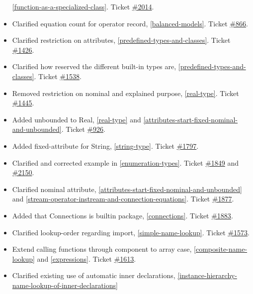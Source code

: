 \documentclass[../MLS.tex]{subfiles}
\begin{document}
\begin{itemize}
  \autoref{function-as-a-specialized-class}. Ticket
  \href{https://trac.modelica.org/Modelica/ticket/2014}{\#2014}.
\item
  Clarified equation count for operator record, \autoref{balanced-models}. Ticket
  \href{https://trac.modelica.org/Modelica/ticket/866}{\#866}.
\item
  Clarified restriction on attributes, \autoref{predefined-types-and-classes}. Ticket
  \href{https://trac.modelica.org/Modelica/ticket/1426}{\#1426}.
\item
  Clarified how reserved the different built-in types are, \autoref{predefined-types-and-classes}.
  Ticket \href{https://trac.modelica.org/Modelica/ticket/1538}{\#1538}.
\item
  Removed restriction on nominal and explained purpose, \autoref{real-type}.
  Ticket \href{https://trac.modelica.org/Modelica/ticket/1445}{\#1445}.
\item
  Added unbounded to Real, \autoref{real-type} and \autoref{attributes-start-fixed-nominal-and-unbounded}. Ticket
  \href{https://trac.modelica.org/Modelica/ticket/926}{\#926}.
\item
  Added fixed-attribute for String, \autoref{string-type}. Ticket
  \href{https://trac.modelica.org/Modelica/ticket/1797}{\#1797}.
\item
  Clarified and corrected example in \autoref{enumeration-types}. Ticket
  \href{https://trac.modelica.org/Modelica/ticket/1849}{\#1849} and
  \href{https://trac.modelica.org/Modelica/ticket/2150}{\#2150}.
\item
  Clarified nominal attribute, \autoref{attributes-start-fixed-nominal-and-unbounded} 
  and \autoref{stream-operator-instream-and-connection-equations}. Ticket
  \href{https://trac.modelica.org/Modelica/ticket/1877}{\#1877}.
\item
  Added that Connections is builtin package, \autoref{connections}. Ticket
  \href{https://trac.modelica.org/Modelica/ticket/1883}{\#1883}.
\item
  Clarified lookup-order regarding import, \autoref{simple-name-lookup}. Ticket
  \href{https://trac.modelica.org/Modelica/ticket/1573}{\#1573}.
\item
  Extend calling functions through component to array case, \autoref{composite-name-lookup} and \autoref{expressions}. Ticket
  \href{https://trac.modelica.org/Modelica/ticket/1613}{\#1613}.
\item
  Clarified existing use of automatic inner declarations, \autoref{instance-hierarchy-name-lookup-of-inner-declarations}

\end{itemize}
\end{document}
